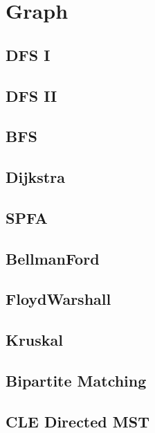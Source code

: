 \section{Graph}

\subsection{DFS I}

\subsection{DFS II}


\subsection{BFS}


\subsection{Dijkstra}


\subsection{SPFA}


\subsection{BellmanFord}


\subsection{FloydWarshall}


\subsection{Kruskal}


\subsection{Bipartite Matching}


\subsection{CLE Directed MST}



